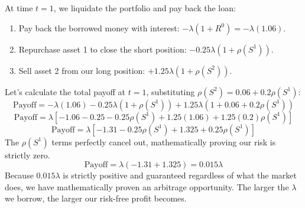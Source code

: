 At time $t=1$, we liquidate the portfolio and pay back the loan:
\begin{enumerate}
    \item Pay back the borrowed money with interest: $-\lambda(1 + R^0) = -\lambda(1.06)$.
    \item Repurchase asset 1 to close the short position: $-0.25\lambda(1 + \rho(S^1))$.
    \item Sell asset 2 from our long position: $+1.25\lambda(1 + \rho(S^2))$.
\end{enumerate}
Let's calculate the total payoff at $t=1$, substituting $\rho(S^2) = 0.06 + 0.2\rho(S^1)$:
\[
\text{Payoff} = -\lambda(1.06) - 0.25\lambda(1 + \rho(S^1)) + 1.25\lambda(1 + 0.06 + 0.2\rho(S^1))
\]
\[
\text{Payoff} = \lambda \left[ -1.06 - 0.25 - 0.25\rho(S^1) + 1.25(1.06) + 1.25(0.2)\rho(S^1) \right]
\]
\[
\text{Payoff} = \lambda \left[ -1.31 - 0.25\rho(S^1) + 1.325 + 0.25\rho(S^1) \right]
\]
The $\rho(S^1)$ terms perfectly cancel out, mathematically proving our risk is strictly zero.
\[
\text{Payoff} = \lambda(-1.31 + 1.325) = 0.015\lambda
\]
Because $0.015\lambda$ is strictly positive and guaranteed regardless of what the market does, we have mathematically proven an arbitrage opportunity. The larger the $\lambda$ we borrow, the larger our risk-free profit becomes.